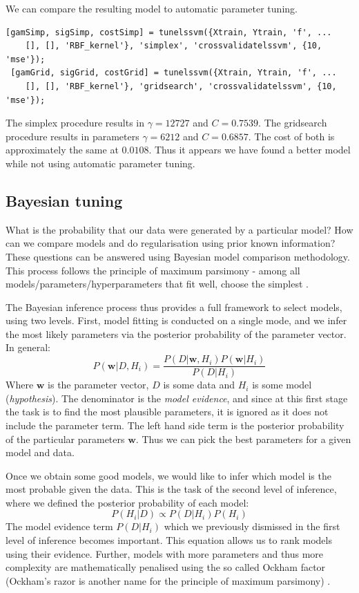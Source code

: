 \documentclass[10pt,a4paper]{article}
\begin{document}
We can compare the resulting model to automatic parameter tuning.

\begin{lstlisting}[style=Matlab-editor, frame=single]
[gamSimp, sigSimp, costSimp] = tunelssvm({Xtrain, Ytrain, 'f', ...
    [], [], 'RBF_kernel'}, 'simplex', 'crossvalidatelssvm', {10, 'mse'});
 [gamGrid, sigGrid, costGrid] = tunelssvm({Xtrain, Ytrain, 'f', ...
    [], [], 'RBF_kernel'}, 'gridsearch', 'crossvalidatelssvm', {10, 'mse'});
\end{lstlisting}

The simplex procedure results in $\gamma=12727$ and $C=0.7539$. The gridsearch procedure results in parameters $\gamma=6212$ and $C=0.6857$. The cost of both is approximately the same at $0.0108$. Thus it appears we have found a better model while not using automatic parameter tuning.

\subsection{Bayesian tuning}
What is the probability that our data were generated by a particular model? How can we compare models and do regularisation using prior known information? These questions can be answered using Bayesian model comparison methodology. This process follows the principle of maximum parsimony - among all models/parameters/hyperparameters that fit well, choose the simplest \cite{MacKay91bayesianinterpolation}.

The Bayesian inference process thus provides a full framework to select models, using two levels. First, model fitting is conducted on a single mode, and we infer the most likely parameters via the posterior probability of the parameter vector. In general:
$$
P(\mathbf{w} | D, H_i) = \frac{P(D | \mathbf{w}, H_i)P(\mathbf{w} | H_i)}{P(D | H_i)}
$$
Where $\mathbf{w}$ is the parameter vector, $D$ is some data and $H_i$ is some model (\textit{hypothesis}). The denominator is the \textit{model evidence}, and since at this first stage the task is to find the most plausible parameters, it is ignored as it does not include the parameter term. The left hand side term is the posterior probability of the particular parameters $\mathbf{w}$. Thus we can pick the best parameters for a given model and data.

Once we obtain some good models, we would like to infer which model is the most probable given the data. This is the task of the second level of inference, where we defined the posterior probability of each model:
$$
P(H_i | D) \propto P(D | H_i)P(H_i)
$$
The model evidence term $P(D | H_i)$ which we previously dismissed in the first level of inference becomes important. This equation allows us to rank models using their evidence. Further, models with more parameters and thus more complexity are mathematically penalised using the so called Ockham factor (Ockham's razor is another name for the principle of maximum parsimony) \cite{MacKay91bayesianinterpolation}.
\end{document}
